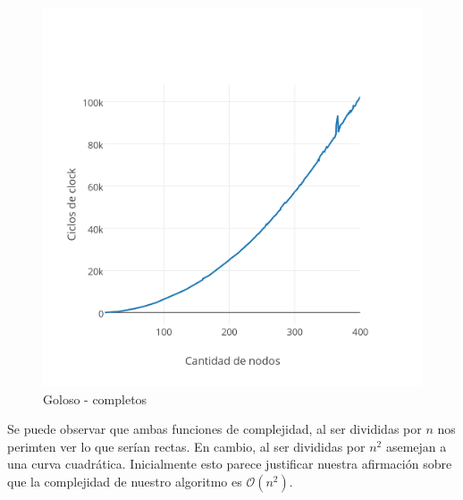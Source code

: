 \begin{figure}[htb]
	\begin{center}
    		\includegraphics[scale=0.6]{imagenes/goloso-completos.png}
	\end{center}
	\caption{Goloso - completos\label{fig:2C}}
\end{figure}
%
%
%
Se puede observar que ambas funciones de complejidad, al ser divididas por $n$ nos perimten ver lo que serían rectas. En cambio, al ser divididas por $n^2$ asemejan a una curva cuadrática. Inicialmente esto parece justificar nuestra afirmación sobre que la complejidad de nuestro algoritmo es $\mathcal{O}(n^2)$.

